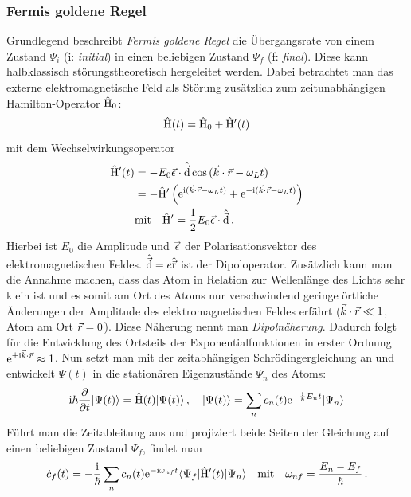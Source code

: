 \subsubsection{Fermis goldene Regel}\label{subsubsec:fermis_goldene_regel}
Grundlegend beschreibt \textit{Fermis goldene Regel} die
Übergangsrate von einem Zustand $\Psi_i$ (i: \textit{initial}) in einen
beliebigen Zustand $\Psi_f$ (f: \textit{final}). Diese kann halbklassisch
störungstheoretisch hergeleitet werden.  Dabei betrachtet man das externe elektromagnetische Feld als Störung
zusätzlich zum zeitunabhängigen Hamilton-Operator $\hat{\mathrm{H}}_0$:
\begin{equation}\label{eq:hamilton}
	\hat{\mathrm{H}}(t)=\hat{\mathrm{H}}_0+\hat{\mathrm{H}}'(t)
\end{equation}
mit dem Wechselwirkungsoperator
\begin{equation}\label{eq:ww}
	\begin{split}
		\hat{\mathrm{H}}'(t) &= -E_0\vec{\epsilon}\cdot\hat{\vec{\mathrm{d}}}\cos{(\vec{k}\cdot\vec{r}-\omega_L t)}\\
		&=
		-\hat{\mathrm{H}}'\left(\mathrm{e}^{\mathrm{i}(\vec{k}\cdot\vec{r}-\omega_L
		t)}+\mathrm{e}^{-\mathrm{i}(\vec{k}\cdot\vec{r}-\omega_L t)}\right)\\
		&\text{mit}\quad
		\hat{\mathrm{H}}'=\frac{1}{2}E_0\vec{\epsilon}\cdot\hat{\vec{\mathrm{d}}}\,.
	\end{split}
\end{equation}
Hierbei ist $E_0$ die Amplitude und $\vec{\epsilon}$ der
Polarisationsvektor des elektromagnetischen Feldes. $\hat{\vec{\mathrm{d}}} = e\hat{\vec{\mathrm{r}}}$ ist
der Dipoloperator. Zusätzlich kann man die Annahme machen, dass das Atom in Relation zur
Wellenlänge des Lichts sehr klein ist und es somit am Ort
des Atoms nur verschwindend geringe örtliche Änderungen der Amplitude des
elektromagnetischen Feldes erfährt ($\vec{k}\cdot\vec{r}\ll 1$, Atom am Ort $\vec{r}=0$). Diese Näherung nennt man
\textit{Dipolnäherung}. Dadurch folgt für die Entwicklung des
Ortsteils der Exponentialfunktionen in erster Ordnung
$\mathrm{e}^{\pm\mathrm{i}\vec{k}\cdot\vec{r}}\approx1$. Nun setzt man mit der zeitabhängigen Schrödingergleichung an und entwickelt $\Psi(t)$ in die stationären Eigenzustände $\Psi_n$ des Atoms:
\begin{equation}\label{eq:sgl_stoerung_01}
	\mathrm{i}\hbar\frac{\partial }{\partial t}|{\Psi(t)}\rangle=\hat{\mathrm{H}}(t)|{\Psi(t)}\rangle\,,
	\quad
	|{\Psi(t)}\rangle=\sum\limits_n{c_n(t)\mathrm{e}^{-\frac{\mathrm{i}}{\hbar} E_n
	t}|{\Psi_n}\rangle}
\end{equation}
Führt man die Zeitableitung aus und projiziert beide Seiten der Gleichung auf
einen beliebigen Zustand $\Psi_f$, findet man
\begin{equation}\label{eq:sgl_stoerung_02}
	\dot
	c_f(t)=-\frac{\mathrm{i}}{\hbar}\sum\limits_n{c_n(t)\mathrm{e}^{-\mathrm{i}\omega_{nf}t}\langle{\Psi_f}|\hat{\mathrm{H}}'(t)|{\Psi_n}\rangle}
	\quad\text{mit}\quad
	\omega_{nf}=\frac{E_n-E_f}{\hbar}\,.
\end{equation}
